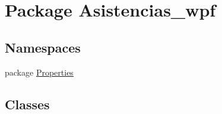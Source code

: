 \hypertarget{namespace_asistencias__wpf}{\section{Package Asistencias\-\_\-wpf}
\label{namespace_asistencias__wpf}
}
\subsection*{Namespaces}
\begin{DoxyCompactItemize}
\item 
package \hyperlink{namespace_asistencias__wpf_1_1_properties}{Properties}
\end{DoxyCompactItemize}
\subsection*{Classes}
